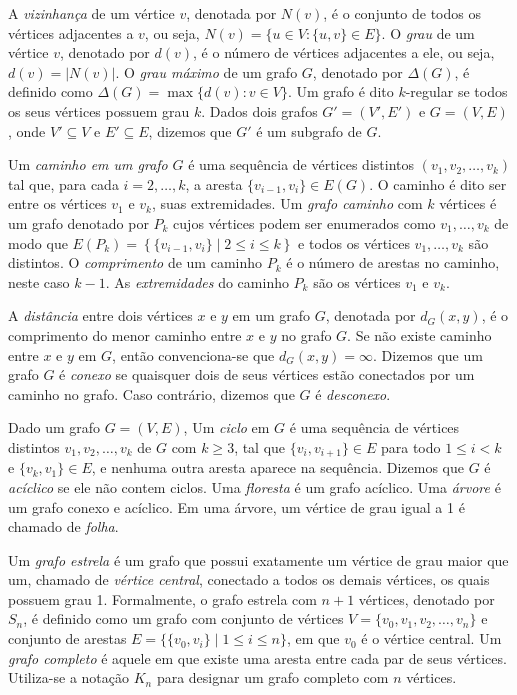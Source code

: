 A \emph{vizinhança} de um vértice $v$, denotada por $N(v)$, é o conjunto de todos os vértices adjacentes a $v$, ou seja, $N(v) = \{u \in V : \{u, v\} \in E\}$. O \emph{grau} de um vértice $v$, denotado por $d(v)$, é o número de 
vértices adjacentes a ele, ou seja, $d(v) = |N(v)|$. O \emph{grau máximo} de um grafo $G$, denotado por $\Delta(G)$, é definido como $\Delta(G) = \max\{d(v) \colon v \in V\}$. Um grafo é dito $k$-regular se todos os seus vértices possuem grau $k$. Dados dois grafos  \( G' = (V', E') \) e \( G = (V, E) \), onde \( V' \subseteq V \) e \( E' \subseteq E\), dizemos que \( G' \) é um subgrafo de \( G \).

Um \emph{caminho em um grafo} \( G \) é uma sequência de vértices distintos \( (v_1, v_2, \ldots, v_k) \) tal que, para cada \( i = 2, \ldots, k \), a aresta \( \{v_{i-1}, v_i\} \in E(G) \). O caminho é dito ser entre os vértices \( v_1 \) e \( v_k \), suas extremidades. Um \emph{grafo caminho} com $k$ vértices  é um grafo denotado por \( P_k \) cujos vértices podem ser enumerados como \( v_1, \ldots, v_k \) de modo que
\(
E(P_k) = \left\{ \{v_{i-1}, v_i\} \mid 2 \leq i \leq k \right\}
\)
e todos os vértices \( v_1, \ldots, v_k \) são distintos. O \emph{comprimento} de um caminho $P_k$ é o número de arestas no caminho, neste caso \( k-1 \). As \emph{extremidades} do caminho $P_k$ são os vértices \( v_1 \) e \( v_k \). 

A \emph{distância} entre dois vértices \( x \) e \( y \) em um grafo $G$, denotada por \( d_G(x, y) \), é o comprimento do menor caminho entre \( x \) e \( y \) no grafo \( G \). Se não existe caminho entre \( x \) e \( y \) em $G$, então convenciona-se que \( d_G(x, y) = \infty \). Dizemos que um grafo $G$ é \emph{conexo} se quaisquer dois de seus vértices estão conectados por um caminho no grafo. Caso contrário, dizemos que $G$ é \emph{desconexo}. 

Dado um grafo $G=(V,E)$, Um \emph{ciclo} em $G$ é uma sequência de vértices distintos \( v_1, v_2, \dots, v_k \) de $G$ com \( k \geq 3 \), tal que \( \{v_i, v_{i+1}\} \in E \) para todo \( 1 \leq i < k \) e \( \{v_k, v_1\} \in E \), e nenhuma outra aresta aparece na sequência. Dizemos que $G$ é \emph{acíclico} se ele não contem ciclos. Uma \emph{floresta} é um grafo acíclico. Uma \emph{árvore} é um grafo conexo e acíclico. Em uma árvore, um vértice de grau igual a 1 é chamado de \emph{folha}.

Um \emph{grafo estrela} é um grafo que possui exatamente um vértice de grau maior que um, chamado de \emph{vértice central}, conectado a todos os demais vértices, os quais possuem grau 1. Formalmente, o grafo estrela com \( n+1 \) vértices, denotado por \( S_n \), é definido como um grafo com conjunto de vértices \( V = \{v_0, v_1, v_2, \dots, v_n\} \) e conjunto de arestas \(E = \{\{v_0, v_i\} \mid 1 \leq i \leq n\}\), em que \( v_0 \) é o vértice central. Um \emph{grafo completo} é aquele em que existe uma aresta entre cada par de seus vértices. Utiliza-se a notação $K_n$ para designar um grafo completo com $n$ vértices.





